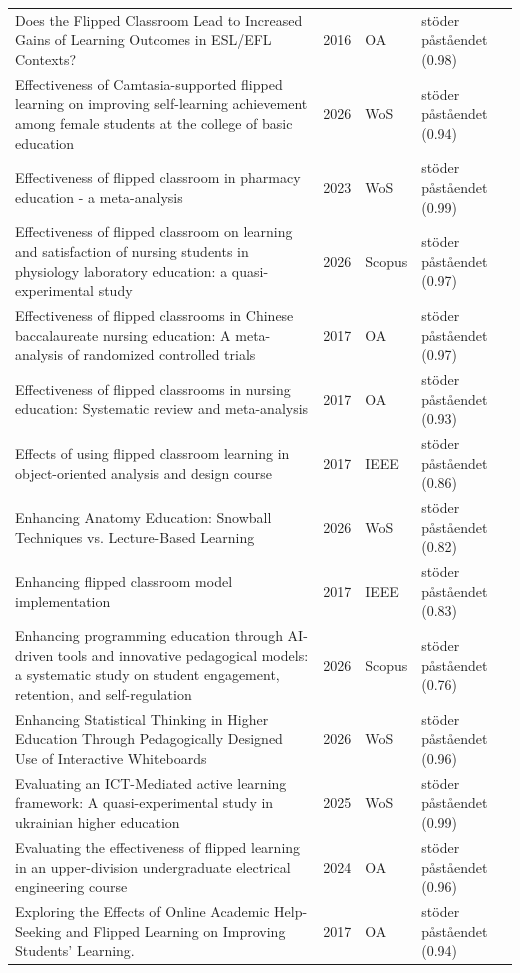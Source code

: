\begin{longtable}{@{}%
  >{\raggedright\arraybackslash}p{}c%
  >{\raggedright\arraybackslash}p{}%
  >{\raggedright\arraybackslash}p{}@{}}
Does the Flipped Classroom Lead to Increased Gains of Learning Outcomes in ESL/EFL Contexts? & 2016 & OA & stöder påståendet (0.98) \\
Effectiveness of Camtasia-supported flipped learning on improving self-learning achievement among female students at the college of basic education & 2026 & WoS & stöder påståendet (0.94) \\
Effectiveness of flipped classroom in pharmacy education - a meta-analysis & 2023 & WoS & stöder påståendet (0.99) \\
Effectiveness of flipped classroom on learning and satisfaction of nursing students in physiology laboratory education: a quasi-experimental study & 2026 & Scopus & stöder påståendet (0.97) \\
Effectiveness of flipped classrooms in Chinese baccalaureate nursing education: A meta-analysis of randomized controlled trials & 2017 & OA & stöder påståendet (0.97) \\
Effectiveness of flipped classrooms in nursing education: Systematic review and meta-analysis & 2017 & OA & stöder påståendet (0.93) \\
Effects of using flipped classroom learning in object-oriented analysis and design course & 2017 & IEEE & stöder påståendet (0.86) \\
Enhancing Anatomy Education: Snowball Techniques vs. Lecture-Based Learning & 2026 & WoS & stöder påståendet (0.82) \\
Enhancing flipped classroom model implementation & 2017 & IEEE & stöder påståendet (0.83) \\
Enhancing programming education through AI-driven tools and innovative pedagogical models: a systematic study on student engagement, retention, and self-regulation & 2026 & Scopus & stöder påståendet (0.76) \\
Enhancing Statistical Thinking in Higher Education Through Pedagogically Designed Use of Interactive Whiteboards & 2026 & WoS & stöder påståendet (0.96) \\
Evaluating an ICT-Mediated active learning framework: A quasi-experimental study in ukrainian higher education & 2025 & WoS & stöder påståendet (0.99) \\
Evaluating the effectiveness of flipped learning in an upper-division undergraduate electrical engineering course & 2024 & OA & stöder påståendet (0.96) \\
Exploring the Effects of Online Academic Help-Seeking and Flipped Learning on Improving Students' Learning. & 2017 & OA & stöder påståendet (0.94) \\

\end{longtable}
